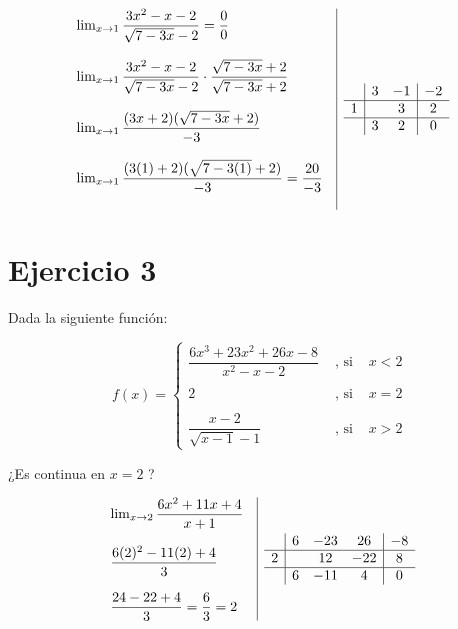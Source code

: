 \documentclass[12pt]{article}
\begin{document}
\[
\begin{array}{l|c}
  \begin{array}{l}
    \lim_{x \to 1} \dfrac{3x^2 - x - 2}{\sqrt{7-3x} - 2} = \dfrac{0}{0} \\\\
    \lim_{x \to 1} \dfrac{3x^2 - x - 2}{\sqrt{7-3x} - 2} \cdot \dfrac{\sqrt{7-3x} + 2}{\sqrt{7-3x} + 2} \\\\
    \lim_{x \to 1} \dfrac{(3x + 2)(\sqrt{7-3x} + 2)}{-3} \\\\
    \lim_{x \to 1} \dfrac{(3(1) + 2)(\sqrt{7-3(1)} + 2)}{-3} = \dfrac{20}{-3} \\\\
  \end{array}
  &
  \begin{array}{c|c c|c}
    & 3 & -1 & -2 \\
    \hline
    1 &  & 3 & 2 \\
    \hline
    & 3 & 2 & 0 \\
  \end{array}
\end{array}
\]





\newpage
\section*{Ejercicio 3}
\noindent Dada la siguiente función:

\[
f(x) = 
\left\{
  \begin{array}{cll}
    \dfrac{6x^3 + 23x^2 + 26x - 8}{x^2 - x -2} & \text{ , si } & x < 2 \\\\
    2 & \text{ , si } & x = 2 \\\\
    \dfrac{x-2}{\sqrt{x-1} - 1} & \text{ , si } & x > 2
  \end{array}
\right.
\]

\noindent ¿Es continua en $x=2$ ?

\[
\begin{array}{l|c}
  \begin{array}{l}
    \lim_{x \to 2} \dfrac{6x^2 + 11x + 4}{x + 1} \\\\
    \dfrac{6(2)^2 - 11(2) + 4}{3} \\\\
    \dfrac{24 - 22 + 4}{3} = \dfrac{6}{3} = 2
  \end{array}
  &
  \begin{array}{c|c c c|c}
    & 6 & -23 & 26 & -8 \\
    \hline
    2 &  & 12 & -22 & 8 \\
    \hline
    & 6 & -11 & 4 & 0 \\
  \end{array}
\end{array}
\]
\end{document}
